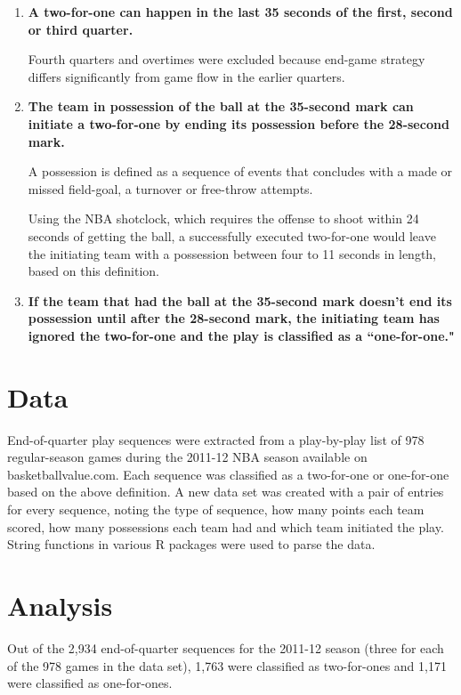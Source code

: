 \documentclass{article}
\begin{document}
\begin{enumerate}
\item \textbf{A two-for-one can happen in the last 35 seconds of the first, second or third quarter.}

Fourth quarters and overtimes were excluded because end-game strategy differs significantly from game flow in the earlier quarters.

\item \textbf{The team in possession of the ball at the 35-second mark can initiate a two-for-one by ending its possession before the 28-second mark.}

A possession is defined as a sequence of events that concludes with a made or missed field-goal, a turnover or free-throw attempts.

Using the NBA shotclock, which requires the offense to shoot within 24 seconds of getting the ball, a successfully executed two-for-one would leave the initiating team with a possession between four to 11 seconds in length, based on this definition.

\item \textbf{If the team that had the ball at the 35-second mark doesn't end its possession until after the 28-second mark, the initiating team has ignored the two-for-one and the play is classified as a ``one-for-one."}

\end{enumerate}

\section{Data}

End-of-quarter play sequences were extracted from a play-by-play list of 978 regular-season games during the 2011-12 NBA season available on basketballvalue.com. Each sequence was classified as a two-for-one or one-for-one based on the above definition. A new data set was created with a pair of entries for every sequence, noting the type of sequence, how many points each team scored, how many possessions each team had and which team initiated the play. String functions in various R packages were used to parse the data.

\section{Analysis}

Out of the 2,934 end-of-quarter sequences for the 2011-12 season (three for each of the 978 games in the data set), 1,763 were classified as two-for-ones and 1,171 were classified as one-for-ones.
\end{document}
